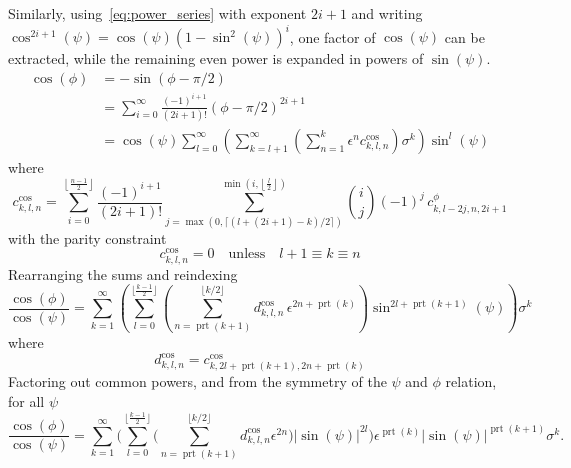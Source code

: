 \documentclass[a4paper]{amsart}
\DeclareMathOperator{\prt}{prt}
\begin{document}
Similarly, using~\eqref{eq:power_series} with exponent $2i+1$ and writing $\cos^{2i+1}(\psi)=\cos(\psi)(1-\sin^2(\psi))^i$, one factor of $\cos(\psi)$ can be extracted, while the remaining even power is expanded in powers of $\sin(\psi)$.
\begin{align*}
\cos(\phi)&=-\sin(\phi - \pi/2)\\
&=\sum_{i=0}^\infty\frac{(-1)^{i+1}}{(2i+1)!}(\phi-\pi/2)^{2i+1}\\
&=\cos(\psi)\sum_{l=0}^\infty\left(\sum_{k=l+1}^\infty\left(\sum_{n=1}^k\epsilon^nc^{\cos}_{k,l,n}\right)\sigma^k\right)\sin^l(\psi)
\end{align*}
where
\begin{equation*}
c^{\cos}_{k,l,n}
=\sum_{i=0}^{\left\lfloor\frac{n-1}{2}\right\rfloor}\frac{(-1)^{i+1}}{(2i+1)!}
\sum_{j=\max(0,\lceil(l+(2i+1)-k)/2\rceil)}^{\min(i,\left\lfloor\frac{l}{2}\right\rfloor)}
\binom{i}{j}(-1)^j\,c^{\phi}_{k,l-2j,n,2i+1}
\end{equation*}
with the parity constraint
\begin{equation*}
c^{\cos}_{k,l,n}=0\quad\text{unless}\quad l+1\equiv  k\equiv n
\end{equation*}
Rearranging the sums and reindexing
\begin{equation*}
\frac{\cos(\phi)}{\cos(\psi)}
=
\sum_{k=1}^{\infty}
\left(
\sum_{l=0}^{\lfloor\frac{k-1}{2}\rfloor}
\left(
\sum_{n=\prt(k+1)}^{\lfloor k/2\rfloor}
d^{\cos}_{k,l,n}\,
\epsilon^{2n+\prt(k)}
\right)
\sin^{2l+\prt(k+1)}(\psi)
\right)
\sigma^k
\end{equation*}
where
\begin{equation}\label{eq:d_cos}
d^{\cos}_{k,l,n}
=
c^{\cos}_{k,2l+\prt(k+1),2n+\prt(k)}
\end{equation}
%
Factoring out common powers, and from the symmetry of the $\psi$ and $\phi$ relation, for all $\psi$
%
\begin{equation*}
\frac{\cos(\phi)}{\cos(\psi)}
=\!
\sum_{k=1}^{\infty}
\!\Bigg(
\sum_{l=0}^{\lfloor \frac{k-1}{2}\rfloor}
\!\Bigg(
\sum_{n=\prt(k+1)}^{\lfloor k/2\rfloor}
d^{\cos}_{k,l,n}
\epsilon^{2n}
\!\Bigg)
|\sin(\psi)|^{2l}
\!\Bigg)
\epsilon^{\prt(k)}
|\sin(\psi)|^{\prt(k+1)}
\sigma^k .
\end{equation*}
\end{document}
